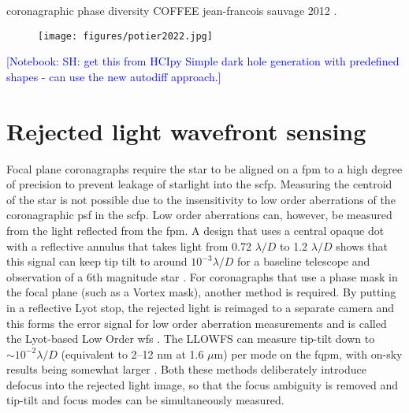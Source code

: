 \documentclass[letterpaper]{ar-1col}
\newcommand{\mum}{$\mu$m}
\newcommand{\ld}{$\lambda/D$}
\newcommand{\notebooksuggestion}[1]{\textcolor{blue}{[Notebook: #1]}}
\begin{document}
coronagraphic phase diversity
COFFEE jean-francois sauvage 2012 \citep{Sauvage12}.

\begin{figure}[ht]
  \centering
  \texttt{[image: figures/potier2022.jpg]}
  \caption{}
  \label{fig:fpwfsclean}
\end{figure}

\notebooksuggestion{SH: get this from HCIpy Simple dark hole generation with predefined shapes - can use the new autodiff approach.}





\section{Rejected light wavefront sensing} 

Focal plane coronagraphs require the star to be aligned on a \ac{fpm} to a high degree of precision to prevent leakage of starlight into the \ac{scfp}.
%
Measuring the centroid of the star is not possible due to the insensitivity to low order aberrations of the coronagraphic \ac{psf} in the \ac{scfp}.
%
Low order aberrations can, however, be measured from the light reflected from the \ac{fpm}.
%
A design that uses a central opaque dot with a reflective annulus that takes light from 0.72 \ld{} to 1.2 \ld{} shows that this signal can keep tip tilt to around $10^{-3}$\ld{} for a baseline telescope and observation of a 6th magnitude star \citep[Coronagraphic low order \ac{wfs}; CLOWFS ][]{Guyon09}.
%
For coronagraphs that use a phase mask in the focal plane (such as a Vortex mask), another method is required.
%
By putting in a reflective Lyot stop, the rejected light is reimaged to a separate camera and this forms the error signal for low order aberration measurements and is called the Lyot-based Low Order \ac{wfs} \citep[LLOWFS; ][]{Singh14,Singh15}.
%
The LLOWFS can measure tip-tilt down to $\sim 10^{-2}$\ld{} (equivalent to 2–12 nm at 1.6 \mum{}) per mode on the \ac{fqpm}, with on-sky results being somewhat larger \citep{Singh15}.
%
Both these methods deliberately introduce defocus into the rejected light image, so that the focus ambiguity is removed and tip-tilt and focus modes can be simultaneously measured.
\end{document}
